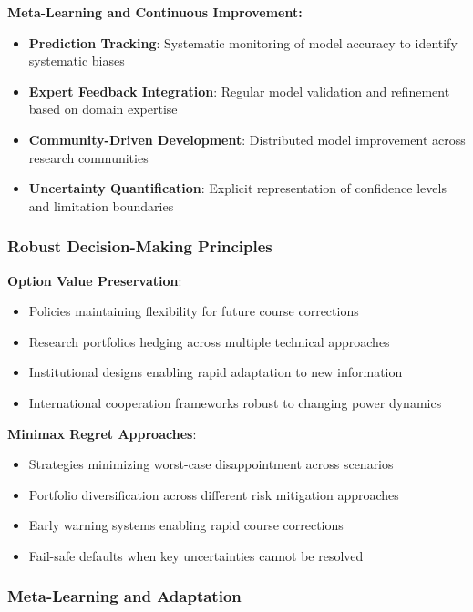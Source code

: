 \documentclass[
  11pt,
  letterpaper,
]{book}
\providecommand{\tightlist}{%
  \setlength{\itemsep}{0pt}\setlength{\parskip}{0pt}}
\begin{document}
\textbf{Meta-Learning and Continuous Improvement:}

\begin{itemize}
\tightlist
\item
  \textbf{Prediction Tracking}: Systematic monitoring of model accuracy
  to identify systematic biases
\item
  \textbf{Expert Feedback Integration}: Regular model validation and
  refinement based on domain expertise
\item
  \textbf{Community-Driven Development}: Distributed model improvement
  across research communities
\item
  \textbf{Uncertainty Quantification}: Explicit representation of
  confidence levels and limitation boundaries
\end{itemize}

\subsubsection{Robust Decision-Making
Principles}\label{sec-robust-principles}

\textbf{Option Value Preservation}:

\begin{itemize}
\tightlist
\item
  Policies maintaining flexibility for future course corrections
\item
  Research portfolios hedging across multiple technical approaches
\item
  Institutional designs enabling rapid adaptation to new information
\item
  International cooperation frameworks robust to changing power dynamics
\end{itemize}

\textbf{Minimax Regret Approaches}:

\begin{itemize}
\tightlist
\item
  Strategies minimizing worst-case disappointment across scenarios
\item
  Portfolio diversification across different risk mitigation approaches
\item
  Early warning systems enabling rapid course corrections
\item
  Fail-safe defaults when key uncertainties cannot be resolved
\end{itemize}

\subsubsection{Meta-Learning and Adaptation}\label{sec-meta-learning}
\end{document}
